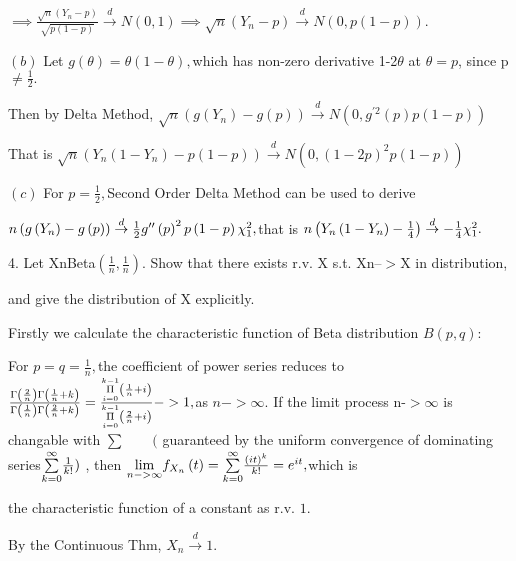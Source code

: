 \documentclass{article}
\def\TEXTsymbol#1{\mbox{$#1$}}%
\begin{document}
$\implies \frac{\sqrt{n}\left( Y_{n}-p\right) }{\sqrt{p\left( 1-p\right) }}%
\overset{d}{\rightarrow }N\left( 0,1\right) \implies \sqrt{n}\left(
Y_{n}-p\right) \overset{d}{\rightarrow }N\left( 0,p\left( 1-p\right) \right)
.$

$\left( b\right) $ Let $g\left( \theta \right) =\theta \left( 1-\theta
\right) ,$which has non-zero derivative 1-2$\theta $ at $\theta =p$, since p$%
\neq \frac{1}{2}.$

Then by Delta Method, $\sqrt{n}\left( g\left( Y_{n}\right) -g\left( p\right)
\right) \overset{d}{\rightarrow }N\left( 0,g^{\prime 2}\left( p\right)
p\left( 1-p\right) \right) $

That is $\sqrt{n}\left( Y_{n}\left( 1-Y_{n}\right) -p\left( 1-p\right)
\right) \overset{d}{\rightarrow }N\left( 0,\left( 1-2p\right) ^{2}p\left(
1-p\right) \right) $

$\left( c\right) $ For $p=\frac{1}{2},$Second Order Delta Method can be used
to derive 

$n\left( g\left( Y_{n}\right) -g\left( p\right) \right) \overset{d}{%
\rightarrow }\frac{1}{2}g^{\prime \prime }\left( p\right) ^{2}p\left(
1-p\right) \chi _{1}^{2},$that is $n\left( Y_{n}\left( 1-Y_{n}\right) -\frac{%
1}{4}\right) \overset{d}{\rightarrow }-\frac{1}{4}\chi _{1}^{2}.$

4. Let XnBeta$\left( \frac{1}{n},\frac{1}{n}\right) $. Show that
there exists r.v. X s.t. Xn--\TEXTsymbol{>}X in distribution,

and give the distribution of X explicitly.

Firstly we calculate the characteristic function of Beta distribution $%
B\left( p,q\right) $:


For $p=q=\frac{1}{n},$the coefficient of power series reduces to $\frac{%
\Gamma \left( \frac{2}{n}\right) \Gamma \left( \frac{1}{n}+k\right) }{\Gamma
\left( \frac{1}{n}\right) \Gamma \left( \frac{2}{n}+k\right) }=\frac{\overset%
{k-1}{\underset{i=0}{\Pi }}\left( \frac{1}{n}+i\right) }{\overset{k-1}{%
\underset{i=0}{\Pi }}\left( \frac{2}{n}+i\right) }->1,$as $n->\infty .$ If
the limit process n-\TEXTsymbol{>}$\infty $ is changable with $\sum \qquad ($%
guaranteed by the uniform convergence of dominating series$\underset{k=0}{%
\overset{\infty }{\sum }}\frac{1}{k!})$ , then $\underset{n->\infty }{\lim }%
f_{X_{n}}\left( t\right) =\underset{k=0}{\overset{\infty }{\sum }}\frac{%
\left( it\right) ^{k}}{k!}=e^{it},$which is 

the characteristic function of a constant as r.v. $1.$

By the Continuous Thm, $X_{n}\overset{d}{\rightarrow }1.$
\end{document}
